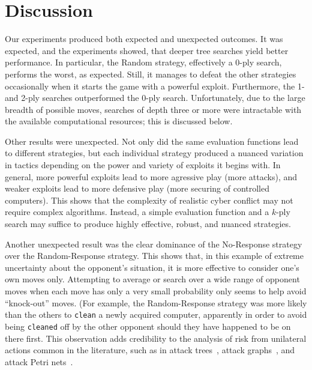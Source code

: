 \documentclass{sig-alternate}
\begin{document}
\section{Discussion}
\label{sec:discussion}
Our experiments produced both expected and unexpected 
outcomes. It was expected, and the experiments showed, that deeper
tree searches yield better performance. In particular, the Random
strategy, effectively a 0-ply search, performs the worst, as
expected. Still, it manages to defeat the other strategies
occasionally when it starts the game with a powerful
exploit. Furthermore, the 1- and 2-ply searches outperformed the 0-ply
search.  Unfortunately, due to the large breadth of possible moves,
searches of depth three or more were intractable with the available
computational resources; this is discussed below.

Other results were unexpected. Not only did the same evaluation
functions lead to different strategies, but each individual strategy
produced a nuanced variation in tactics depending on the power and
variety of exploits it
begins with. 
In general, more powerful exploits lead to more agressive
play (more attacks), and weaker exploits lead to more defensive play
(more securing of controlled computers). This shows that the
complexity of realistic cyber conflict may not require
complex algorithms. Instead, a simple evaluation function and a
$k$-ply search may suffice to produce highly effective, robust, and
nuanced strategies.

Another unexpected result was the clear dominance of the No-Response
strategy over the Random-Response strategy. This shows that, in this
example of extreme uncertainty about the opponent's situation, it is
more effective to consider one's own moves only. Attempting to average
or search over a wide range of opponent moves when each move has only
a very small probability only seems to help avoid ``knock-out''
moves. (For example, the Random-Response strategy was more likely than
the others to {\tt clean} a newly acquired computer, apparently in
order to avoid being {\tt cleaned} off by the other opponent should
they have happened to be on there first. This observation adds
credibility to the analysis of risk from unilateral actions common in the
literature, such as in attack trees~\cite{schneier1999attack}, attack
graphs~\cite{sheyner2002automated}, and attack Petri
nets~\cite{zakrzewska2011modeling}.
\end{document}
